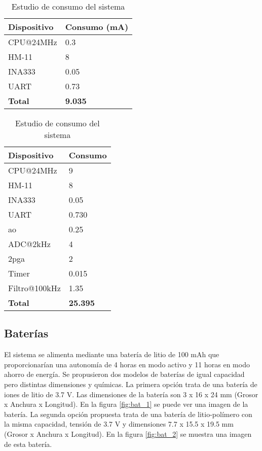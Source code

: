 \begin{table}[!ht]
\centering
	\begin{subtable}{0.5\textwidth}
		\begin{tabular}{ll}
		\textbf{Dispositivo} & \textbf{Consumo (mA)} \\ \hline
		CPU@24MHz            & 0.3                   \\
		HM-11                & 8                     \\
		INA333				 & 0.05					 \\ 
		UART				 & 0.73				 \\ \hline \hline
		\textbf{Total}       & \textbf{9.035}         
		\end{tabular}
	\caption{Modo bajo consumo}
	\end{subtable}

	\begin{subtable}{0.5\textwidth}
	\begin{tabular}{|l|l|}
	\hline
	\textbf{Dispositivo} & \textbf{Consumo} \\ \hline
	CPU@24MHz            & 9                \\ \hline
	HM-11                & 8                \\ \hline
	INA333               & 0.05             \\ \hline
	UART                 & 0.730            \\ \hline
	\acrshort{ao}      & 0.25             \\ \hline
	ADC@2kHz             & 4                \\ \hline
	2\acrshort{pga}    & 2                \\ \hline
	Timer                & 0.015            \\ \hline
	Filtro@100kHz        & 1.35             \\ \hline
	\textbf{Total}       & \textbf{25.395}  \\ \hline
	\end{tabular}
	\caption{Consumo del sistema en modo activo}
	\end{subtable}

\caption{Estudio de consumo del sistema}
\end{table}



\subsection{Baterías}
El sistema se alimenta mediante una batería de litio de 100 mAh que proporcionarían una autonomía de 4 horas en modo activo y 11 horas en modo ahorro de energía. Se propusieron dos modelos de baterías de igual capacidad pero distintas dimensiones y químicas. La primera opción trata de una batería de iones de litio de 3.7 V. Las dimensiones de la batería son 3 x 16 x 24 mm (Grosor x Anchura x Longitud). En la figura \ref{fig:bat_1} se puede ver una imagen de la batería. La segunda opción propuesta trata de una batería de litio-polímero con la misma capacidad, tensión de 3.7 V y dimensiones  7.7 x 15.5 x 19.5 mm (Grosor x Anchura x Longitud). En la figura \ref{fig:bat_2}  se muestra una imagen de esta batería.

